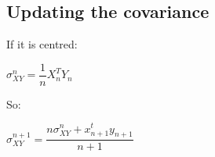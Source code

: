 
\subsection{Updating the covariance}

If it is centred:

\(\sigma_{XY}^n=\dfrac{1}{n}X_n^TY_n\)

So:

\(\sigma_{XY}^{n+1}=\dfrac{n\sigma^n_{XY}+x_{n+1}^ty_{n+1}}{n+1}\)

